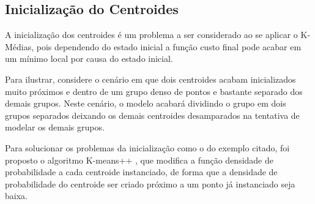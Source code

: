 \subsection{Inicialização do Centroides}

A inicialização dos centroides é um problema a ser considerado ao se aplicar o K-Médias, pois dependendo do estado inicial a função custo final pode acabar em um mínimo local por causa do estado inicial.

Para ilustrar, considere o cenário em que dois centroides acabam inicializados muito próximos e dentro de um grupo denso de pontos e bastante separado dos demais grupos. Neste cenário, o modelo acabará dividindo o grupo em dois grupos separados deixando os demais centroides desamparados na tentativa de modelar os demais grupos.

Para solucionar os problemas da inicialização como o do exemplo citado, foi proposto o algoritmo K-means++ \citep{arthur2007k}, que modifica a função densidade de probabilidade a cada centroide instanciado, de forma que a densidade de probabilidade do centroide ser criado próximo a um ponto já instanciado seja baixa.

